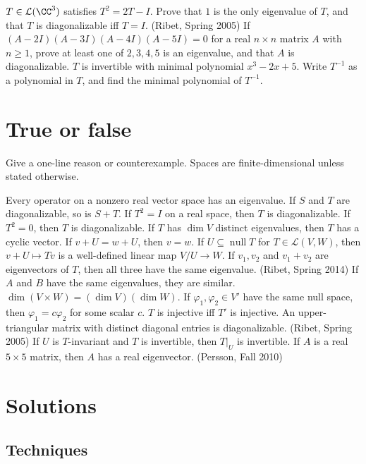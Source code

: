 \documentclass[10pt]{scrartcl}
\DeclareMathOperator{\nul}{null}
\newcommand{\LL}{\mathcal L}
\begin{document}
\begin{problem}
  \leavevmode
  \begin{enumerate}[(a)]
    \ii $T\in\LL(\CC^3)$ satisfies $T^2=2T-I$. Prove that $1$ is the only eigenvalue of $T$, and that $T$ is diagonalizable iff $T=I$.
    \ii (Ribet, Spring 2005) If $(A-2I)(A-3I)(A-4I)(A-5I)=0$ for a real $n\times n$ matrix $A$ with $n\ge1$, prove at least one of $2,3,4,5$ is an eigenvalue, and that $A$ is diagonalizable.
    \ii $T$ is invertible with minimal polynomial $x^3-2x+5$. Write $T^{-1}$ as a polynomial in $T$, and find the minimal polynomial of $T^{-1}$.
  \end{enumerate}
\end{problem}

\section{True or false}
Give a one-line reason or counterexample. Spaces are finite-dimensional unless stated otherwise.
\begin{enumerate}
  \ii Every operator on a nonzero real vector space has an eigenvalue.
  \ii If $S$ and $T$ are diagonalizable, so is $S+T$.
  \ii If $T^2=I$ on a real space, then $T$ is diagonalizable.
  \ii If $T^2=0$, then $T$ is diagonalizable.
  \ii If $T$ has $\dim V$ distinct eigenvalues, then $T$ has a cyclic vector.
  \ii If $v+U=w+U$, then $v=w$.
  \ii If $U\subseteq\nul T$ for $T\in\LL(V,W)$, then $v+U\mapsto Tv$ is a well-defined linear map $V/U\to W$.
  \ii If $v_1,v_2$ and $v_1+v_2$ are eigenvectors of $T$, then all three have the same eigenvalue. (Ribet, Spring 2014)
  \ii If $A$ and $B$ have the same eigenvalues, they are similar.
  \ii $\dim(V\times W)=(\dim V)(\dim W)$.
  \ii If $\varphi_1,\varphi_2\in V'$ have the same null space, then $\varphi_1=c\varphi_2$ for some scalar $c$.
  \ii $T$ is injective iff $T'$ is injective.
  \ii An upper-triangular matrix with distinct diagonal entries is diagonalizable. (Ribet, Spring 2005)
  \ii If $U$ is $T$-invariant and $T$ is invertible, then $T|_U$ is invertible.
  \ii If $A$ is a real $5\times5$ matrix, then $A$ has a real eigenvector. (Persson, Fall 2010)
\end{enumerate}

\clearpage
\section{Solutions}\label{sec:sol}

\subsection*{Techniques}
\end{document}
